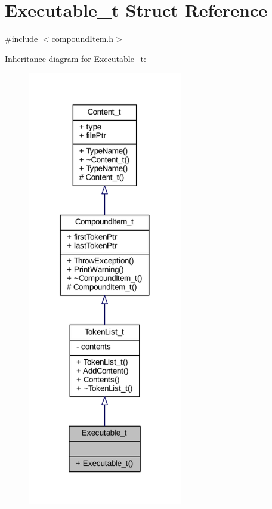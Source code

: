 \hypertarget{struct_executable__t}{}\section{Executable\+\_\+t Struct Reference}
\label{struct_executable__t}


{\ttfamily \#include $<$compound\+Item.\+h$>$}



Inheritance diagram for Executable\+\_\+t\+:
\nopagebreak
\begin{figure}[H]
\begin{center}
\leavevmode
\includegraphics[width=191pt]{struct_executable__t__inherit__graph}
\end{center}
\end{figure}


